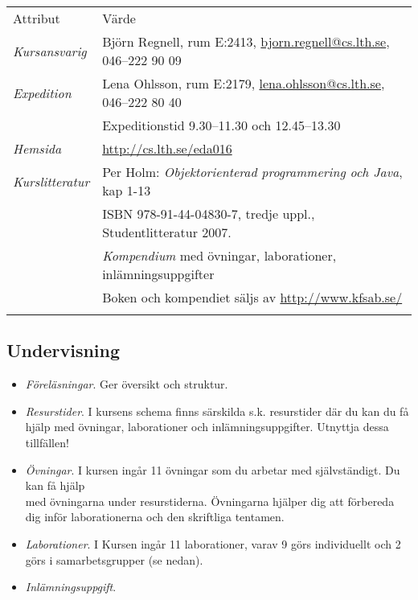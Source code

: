 \begin{longtable}[c]{@{}ll@{}}
\toprule\addlinespace
Attribut & Värde
\\\addlinespace
\midrule\endhead
\emph{Kursansvarig} & Björn Regnell, rum E:2413,
\href{mailto:bjorn.regnell@cs.lth.se}{bjorn.regnell@cs.lth.se}, 046--222
90 09
\\\addlinespace
\emph{Expedition} & Lena Ohlsson, rum E:2179,
\href{mailto:lena.ohlsson@cs.lth.se}{lena.ohlsson@cs.lth.se}, 046--222
80 40
\\\addlinespace
& Expeditionstid 9.30--11.30 och 12.45--13.30
\\\addlinespace
\emph{Hemsida} & \url{http://cs.lth.se/eda016}
\\\addlinespace
\emph{Kurslitteratur} & Per Holm: \emph{Objektorienterad programmering
och Java}, kap 1-13
\\\addlinespace
& ISBN 978-91-44-04830-7, tredje uppl., Studentlitteratur 2007.
\\\addlinespace
& \emph{Kompendium} med övningar, laborationer, inlämningsuppgifter
\\\addlinespace
& Boken och kompendiet säljs av \url{http://www.kfsab.se/}
\\\addlinespace
\bottomrule
\end{longtable}

\subsection{Undervisning}\label{undervisning}

\begin{itemize}
\item
  \emph{Föreläsningar}. Ger översikt och struktur.
\item
  \emph{Resurstider}. I kursens schema finns särskilda s.k. resurstider
  där du kan du få hjälp med övningar, laborationer och
  inlämningsuppgifter. Utnyttja dessa tillfällen!
\item
  \emph{Övningar}. I kursen ingår 11 övningar som du arbetar med
  självständigt. Du kan få hjälp\\med övningarna under resurstiderna.
  Övningarna hjälper dig att förbereda dig inför laborationerna och den
  skriftliga tentamen.
\item
  \emph{Laborationer}. I Kursen ingår 11 laborationer, varav 9 görs
  individuellt och 2 görs i samarbetsgrupper (se nedan).
\item
  \emph{Inlämningsuppgift}.
\end{itemize}

